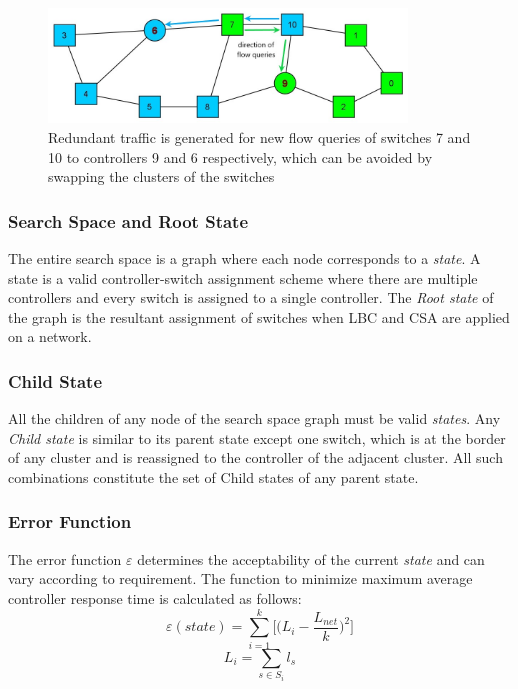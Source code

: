 \documentclass[preprint,12pt]{elsarticle}
\begin{document}
	
	\begin{figure}
		\centering
		\includegraphics[width=0.85\textwidth]{Images/Abilene_overlap.jpg}
		\caption{Redundant traffic is generated for new flow queries of switches 7 and 10 to controllers 9 and 6 respectively, which can be avoided by swapping the clusters of the switches} \label{fig:overlap}
	\end{figure}
	
	\subsubsection{Search Space and Root State}
	The entire search space is a graph where each node corresponds to a \textit{state}. A state is a valid controller-switch assignment scheme where there are multiple controllers and every switch is assigned to a single controller. The \textit{Root state} of the graph is the resultant assignment of switches when LBC and CSA are applied on a network.
	
	\subsubsection{Child State}
	All the children of any node of the search space graph must be valid \textit{states}. Any \textit{Child state} is similar to its parent state except one switch, which is at the border of any cluster and is reassigned to the controller of the adjacent cluster. All such combinations constitute the set of Child states of any parent state.
	
	\subsubsection{Error Function}
	The error function $\varepsilon$ determines the acceptability of the current \textit{state} and can vary according to requirement. The function to minimize maximum average controller response time is calculated as follows:
	\begin{equation}
	\varepsilon(state) = \sum_{i=1}^{k}\Bigg[\Big(L_i - \frac{L_{net}}{k}\Big)^2\Bigg]
	\end{equation}
	\begin{equation} \label{eqn:cload}
	L_i = \sum_{s\in S_i}l_{s}
	\end{equation}
	
\end{document}
